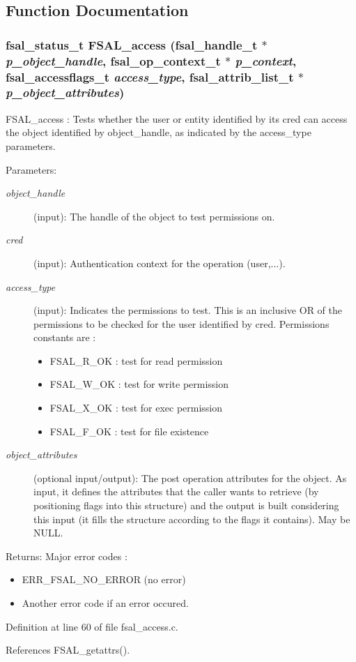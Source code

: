 \subsection{Function Documentation}
\subsubsection[{FSAL\_\-access}]{\setlength{\rightskip}{0pt plus 5cm}fsal\_\-status\_\-t FSAL\_\-access (fsal\_\-handle\_\-t $\ast$ {\em p\_\-object\_\-handle}, \/  fsal\_\-op\_\-context\_\-t $\ast$ {\em p\_\-context}, \/  fsal\_\-accessflags\_\-t {\em access\_\-type}, \/  fsal\_\-attrib\_\-list\_\-t $\ast$ {\em p\_\-object\_\-attributes})}\label{fsal__access_8c_56b9138f0bdbfb81cef5dec9f1ee0d1a}


FSAL\_\-access : Tests whether the user or entity identified by its cred can access the object identified by object\_\-handle, as indicated by the access\_\-type parameters.

\begin{Desc}
\item[Parameters:]
\begin{description}
\item[{\em object\_\-handle}](input): The handle of the object to test permissions on. \item[{\em cred}](input): Authentication context for the operation (user,...). \item[{\em access\_\-type}](input): Indicates the permissions to test. This is an inclusive OR of the permissions to be checked for the user identified by cred. Permissions constants are :\begin{itemize}
\item FSAL\_\-R\_\-OK : test for read permission\item FSAL\_\-W\_\-OK : test for write permission\item FSAL\_\-X\_\-OK : test for exec permission\item FSAL\_\-F\_\-OK : test for file existence \end{itemize}
\item[{\em object\_\-attributes}](optional input/output): The post operation attributes for the object. As input, it defines the attributes that the caller wants to retrieve (by positioning flags into this structure) and the output is built considering this input (it fills the structure according to the flags it contains). May be NULL.\end{description}
\end{Desc}
\begin{Desc}
\item[Returns:]Major error codes :\begin{itemize}
\item ERR\_\-FSAL\_\-NO\_\-ERROR (no error)\item Another error code if an error occured. \end{itemize}
\end{Desc}


Definition at line 60 of file fsal\_\-access.c.

References FSAL\_\-getattrs().